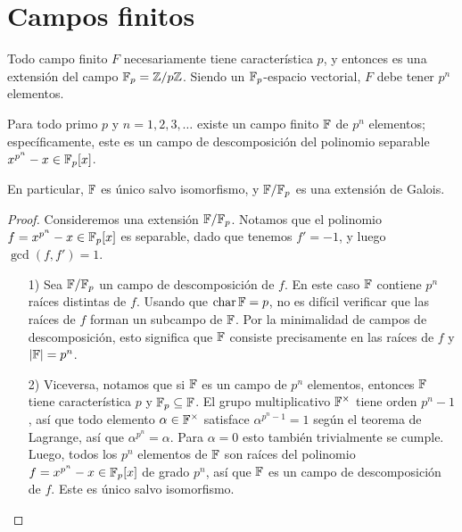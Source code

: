 
\section{Campos finitos}

Todo campo finito $F$ necesariamente tiene característica $p$, y entonces es una
extensión del campo $\mathbb{F}_p = \mathbb{Z}/p\mathbb{Z}$. Siendo un $\mathbb{F}_p$-espacio vectorial, $F$
debe tener $p^n$ elementos.

\begin{teorema}
  Para todo primo $p$ y $n = 1,2,3,\ldots$ existe un campo finito $\mathbb{F}$ de $p^n$
  elementos; específicamente, este es un campo de descomposición del polinomio
  separable $x^{p^n} - x \in \mathbb{F}_p [x]$.

  En particular, $\mathbb{F}$ es único salvo isomorfismo, y $\mathbb{F}/\mathbb{F}_p$ es una
  extensión de Galois.

  \begin{proof}
    Consideremos una extensión $\mathbb{F}/\mathbb{F}_p$. Notamos que el polinomio
    $f = x^{p^n} - x \in \mathbb{F}_p [x]$ es separable, dado que tenemos $f' = -1$,
    y luego $\gcd (f,f') = 1$.

    \begin{enumerate}
    \item[1)] Sea $\mathbb{F}/\mathbb{F}_p$ un campo de descomposición de $f$. En este caso
      $\mathbb{F}$ contiene $p^n$ raíces distintas de $f$. Usando que $\operatorname{char} \mathbb{F} = p$,
      no es difícil verificar que las raíces de $f$ forman un subcampo de
      $\mathbb{F}$. Por la minimalidad de campos de descomposición, esto significa
      que $\mathbb{F}$ consiste precisamente en las raíces de $f$ y $|\mathbb{F}| = p^n$.

    \item[2)] Viceversa, notamos que si $\mathbb{F}$ es un campo de $p^n$ elementos,
      entonces $\mathbb{F}$ tiene característica $p$ y $\mathbb{F}_p \subseteq \mathbb{F}$. El grupo
      multiplicativo $\mathbb{F}^\times$ tiene orden $p^n-1$, así que todo elemento
      $\alpha\in\mathbb{F}^\times$ satisface $\alpha^{p^n-1} = 1$ según el teorema de
      Lagrange, así que $\alpha^{p^n} = \alpha$. Para $\alpha = 0$ esto también
      trivialmente se cumple. Luego, todos los $p^n$ elementos de $\mathbb{F}$ son
      raíces del polinomio $f= x^{p^n} - x \in \mathbb{F}_p [x]$ de grado $p^n$, así
      que $\mathbb{F}$ es un campo de descomposición de $f$. Este es único salvo
      isomorfismo. \qedhere
    \end{enumerate}
  \end{proof}
\end{teorema}

